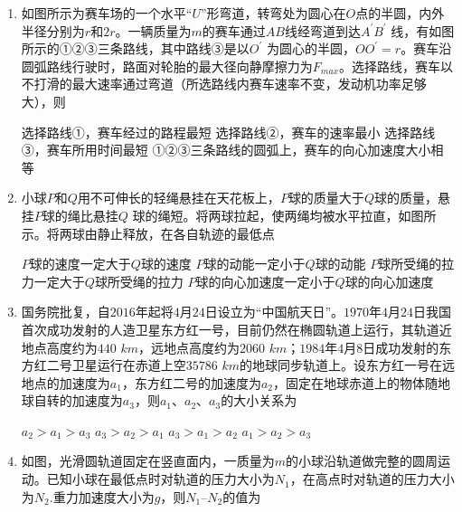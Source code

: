 \begin{enumerate}[leftmargin=0em]
\item 
{}
如图所示为赛车场的一个水平“$ U $”形弯道，转弯处为圆心在$ O $点的半圆，内外半径分别为$ r $和$ 2r $。一辆质量为$ m $的赛车通过$ AB $线经弯道到达$ A ^{\prime} B ^{\prime} $ 线，有如图所示的①②③三条路线，其中路线③是以$ O ^{\prime} $ 为圆心的半圆，$ OO ^{\prime} =r $。赛车沿圆弧路线行驶时，路面对轮胎的最大径向静摩擦力为$ F_{max} $。选择路线，赛车以不打滑的最大速率通过弯道（所选路线内赛车速率不变，发动机功率足够大），则  
\begin{figure}[h!]
\centering

\end{figure}

\fourchoices
{选择路线①，赛车经过的路程最短}
{选择路线②，赛车的速率最小}
{选择路线③，赛车所用时间最短}
{①②③三条路线的圆弧上，赛车的向心加速度大小相等}


\item 
{}
小球$ P $和$ Q $用不可伸长的轻绳悬挂在天花板上，$ P $球的质量大于$ Q $球的质量，悬挂$ P $球的绳比悬挂$ Q $ 球的绳短。将两球拉起，使两绳均被水平拉直，如图所示。将两球由静止释放，在各自轨迹的最低点  
\begin{figure}[h!]
\centering

\end{figure}

\fourchoices
{$ P $球的速度一定大于$ Q $球的速度}
{$ P $球的动能一定小于$ Q $球的动能}
{$ P $球所受绳的拉力一定大于$ Q $球所受绳的拉力}
{$ P $球的向心加速度一定小于$ Q $球的向心加速度}



\item 
{}
国务院批复，自$ 2016 $年起将$ 4 $月$ 24 $日设立为“中国航天日”。$ 1970 $年$ 4 $月$ 24 $日我国首次成功发射的人造卫星东方红一号，目前仍然在椭圆轨道上运行，其轨道近地点高度约为$ 440 $ $ km $，远地点高度约为$ 2060 $ $ km $；$ 1984 $年$ 4 $月$ 8 $日成功发射的东方红二号卫星运行在赤道上空$ 35786 $ $ km $的地球同步轨道上。设东方红一号在远地点的加速度为$ a_{1} $，东方红二号的加速度为$ a_{2} $，固定在地球赤道上的物体随地球自转的加速度为$ a_{3} $，则$ a_{1} $、$ a_{2} $、$ a_{3} $的大小关系为  

\fourchoices
{$ a_{2} > a_{1} >a_{3} $ }
{$ a_{3} >a_{2} > a_{1} $}
{$ a_{3} >a_{1} > a_{2} $ }
{$ a_{1} >a_{2} > a_{3} $}



\item 
{}
如图，光滑圆轨道固定在竖直面内，一质量为$ m $的小球沿轨道做完整的圆周运动。已知小球在最低点时对轨道的压力大小为$ N_{1} $，在高点时对轨道的压力大小为$ N_{2} $.重力加速度大小为$ g $，则$ N_{1} $–$ N_{2} $的值为  



\end{enumerate}
